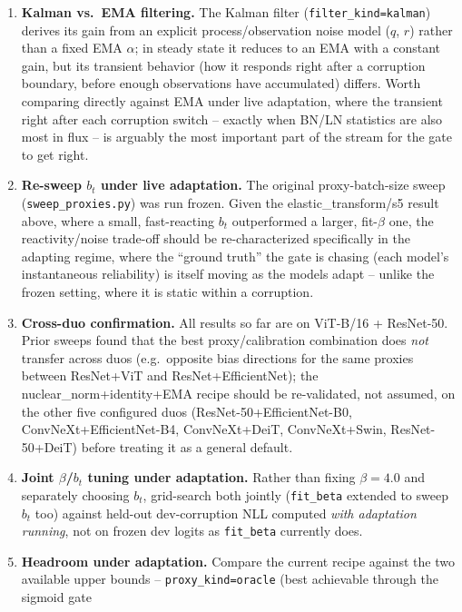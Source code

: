 \begin{enumerate}
    \item \textbf{Kalman vs.\ EMA filtering.} The Kalman filter
    (\texttt{filter\_kind=kalman}) derives its gain from an explicit
    process/observation noise model ($q$, $r$) rather than a fixed EMA
    $\alpha$; in steady state it reduces to an EMA with a constant gain, but
    its transient behavior (how it responds right after a corruption
    boundary, before enough observations have accumulated) differs. Worth
    comparing directly against EMA under live adaptation, where the
    transient right after each corruption switch -- exactly when BN/LN
    statistics are also most in flux -- is arguably the most important part
    of the stream for the gate to get right.
    \item \textbf{Re-sweep $b_t$ under live adaptation.} The original
    proxy-batch-size sweep (\texttt{sweep\_proxies.py}) was run frozen. Given
    the elastic\_transform/s5 result above, where a small, fast-reacting
    $b_t$ outperformed a larger, fit-$\beta$ one, the reactivity/noise
    trade-off should be re-characterized specifically in the adapting
    regime, where the ``ground truth'' the gate is chasing (each model's
    instantaneous reliability) is itself moving as the models adapt --
    unlike the frozen setting, where it is static within a corruption.
    \item \textbf{Cross-duo confirmation.} All results so far are on ViT-B/16
    + ResNet-50. Prior sweeps found that the best proxy/calibration
    combination does \emph{not} transfer across duos (e.g.\ opposite bias
    directions for the same proxies between ResNet+ViT and
    ResNet+EfficientNet); the nuclear\_norm+identity+EMA recipe should be
    re-validated, not assumed, on the other five configured duos
    (ResNet-50+EfficientNet-B0, ConvNeXt+EfficientNet-B4, ConvNeXt+DeiT,
    ConvNeXt+Swin, ResNet-50+DeiT) before treating it as a general default.
    \item \textbf{Joint $\beta$/$b_t$ tuning under adaptation.} Rather than
    fixing $\beta=4.0$ and separately choosing $b_t$, grid-search both
    jointly (\texttt{fit\_beta} extended to sweep $b_t$ too) against
    held-out dev-corruption NLL computed \emph{with adaptation running}, not
    on frozen dev logits as \texttt{fit\_beta} currently does.
    \item \textbf{Headroom under adaptation.} Compare the current recipe
    against the two available upper bounds --
    \texttt{proxy\_kind=oracle} (best achievable through the sigmoid gate

\end{enumerate}
